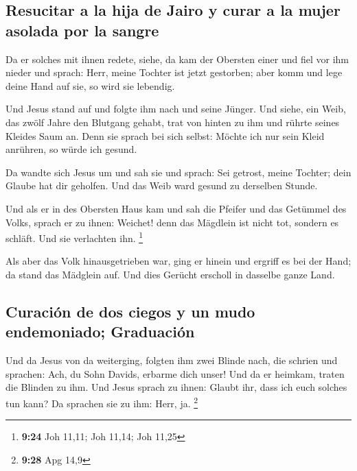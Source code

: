 \hypertarget{resucitar-a-la-hija-de-jairo-y-curar-a-la-mujer-asolada-por-la-sangre}{%
\subsection{Resucitar a la hija de Jairo y curar a la mujer asolada por
la
sangre}\label{resucitar-a-la-hija-de-jairo-y-curar-a-la-mujer-asolada-por-la-sangre}}

 Da er solches mit ihnen redete, siehe, da kam der
Obersten einer und fiel vor ihm nieder und sprach: Herr, meine Tochter
ist jetzt gestorben; aber komm und lege deine Hand auf sie, so wird sie
lebendig.

 Und Jesus stand auf und folgte ihm nach und seine
Jünger.  Und siehe, ein Weib, das zwölf Jahre den
Blutgang gehabt, trat von hinten zu ihm und rührte seines Kleides Saum
an.  Denn sie sprach bei sich selbst: Möchte ich nur sein
Kleid anrühren, so würde ich gesund.

 Da wandte sich Jesus um und sah sie und sprach: Sei
getrost, meine Tochter; dein Glaube hat dir geholfen. Und das Weib ward
gesund zu derselben Stunde.

 Und als er in des Obersten Haus kam und sah die Pfeifer
und das Getümmel des Volks,  sprach er zu ihnen: Weichet!
denn das Mägdlein ist nicht tot, sondern es schläft. Und sie verlachten
ihn. \footnote{\textbf{9:24} Joh 11,11; Joh 11,14; Joh 11,25}

 Als aber das Volk hinausgetrieben war, ging er hinein
und ergriff es bei der Hand; da stand das Mädglein auf. 
Und dies Gerücht erscholl in dasselbe ganze Land.

\hypertarget{curaciuxf3n-de-dos-ciegos-y-un-mudo-endemoniado-graduaciuxf3n}{%
\subsection{Curación de dos ciegos y un mudo endemoniado;
Graduación}\label{curaciuxf3n-de-dos-ciegos-y-un-mudo-endemoniado-graduaciuxf3n}}

 Und da Jesus von da weiterging, folgten ihm zwei Blinde
nach, die schrien und sprachen: Ach, du Sohn Davids, erbarme dich unser!
 Und da er heimkam, traten die Blinden zu ihm. Und Jesus
sprach zu ihnen: Glaubt ihr, dass ich euch solches tun kann? Da sprachen
sie zu ihm: Herr, ja. \footnote{\textbf{9:28} Apg 14,9}

